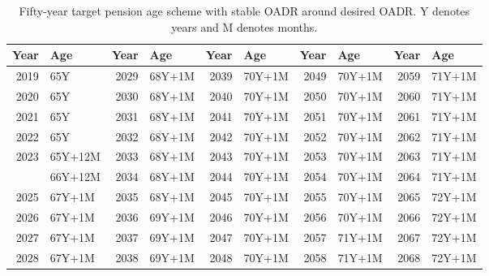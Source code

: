 \documentclass[11pt,a4paper,]{article}
\begin{document}
\begin{table}

\caption{\label{tab:pensionagetables}Fifty-year target pension age scheme with stable OADR around desired OADR. Y denotes years and M denotes months.}
\centering
\begin{tabular}[t]{rlrlrlrlrl}
\toprule
Year & Age & Year & Age & Year & Age & Year & Age & Year & Age\\
\midrule
2019 & 65Y & 2029 & 68Y+1M & 2039 & 70Y+1M & 2049 & 70Y+1M & 2059 & 71Y+1M\\
2020 & 65Y & 2030 & 68Y+1M & 2040 & 70Y+1M & 2050 & 70Y+1M & 2060 & 71Y+1M\\
2021 & 65Y & 2031 & 68Y+1M & 2041 & 70Y+1M & 2051 & 70Y+1M & 2061 & 71Y+1M\\
2022 & 65Y & 2032 & 68Y+1M & 2042 & 70Y+1M & 2052 & 70Y+1M & 2062 & 71Y+1M\\
2023 & 65Y+12M & 2033 & 68Y+1M & 2043 & 70Y+1M & 2053 & 70Y+1M & 2063 & 71Y+1M\\
\addlinespace
2024 & 66Y+12M & 2034 & 68Y+1M & 2044 & 70Y+1M & 2054 & 70Y+1M & 2064 & 71Y+1M\\
2025 & 67Y+1M & 2035 & 68Y+1M & 2045 & 70Y+1M & 2055 & 70Y+1M & 2065 & 72Y+1M\\
2026 & 67Y+1M & 2036 & 69Y+1M & 2046 & 70Y+1M & 2056 & 70Y+1M & 2066 & 72Y+1M\\
2027 & 67Y+1M & 2037 & 69Y+1M & 2047 & 70Y+1M & 2057 & 71Y+1M & 2067 & 72Y+1M\\
2028 & 67Y+1M & 2038 & 69Y+1M & 2048 & 70Y+1M & 2058 & 71Y+1M & 2068 & 72Y+1M\\
\bottomrule
\end{tabular}
\end{table}
\end{document}

